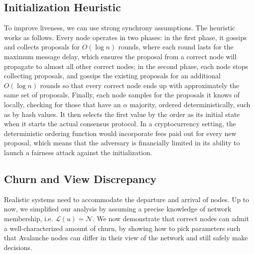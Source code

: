 \documentclass[letterpaper,twocolumn,10pt]{article}
\newcommand{\Oh}[1]{O(#1)}
\theoremstyle{definition}
\begin{document}
\begin{appendices}
\subsection{Initialization Heuristic}
\label{sec:sync-heuristic}
To improve liveness, we can use strong synchrony assumptions. The heuristic works as follows. Every node operates in two phases: in the first phase, it gossips and collects proposals for $\Oh{\log{n}}$ rounds, where each round lasts for the maximum message delay, which ensures the proposal from a correct node will propagate to almost all other correct nodes; in the second phase, each node stops collecting proposals, and gossips the existing proposals for an additional $\Oh{\log{n}}$ rounds so that every correct node ends up with approximately the same set of proposals. Finally, each node samples for the proposals it knows of locally, checking for those that have an $\alpha$ majority, ordered deterministically, such as by hash values. It then selects the first value by the order as its initial state when it starts the actual consensus protocol.
In a cryptocurrency setting, the deterministic ordering function would incorporate fees paid out for every new proposal, which means that the adversary is financially limited in its ability to launch a fairness attack against the initialization.

\subsection{Churn and View Discrepancy}\label{sec:full-analysis-churn}

Realistic systems need to accommodate the departure and arrival of nodes.
Up to now, we simplified our analysis by assuming a precise knowledge of network membership, i.e. $\mathcal{L}(u) = \mathcal{N}$.
We now demonstrate that correct nodes can admit a well-characterized amount of churn, by showing how to pick parameters such that Avalanche nodes can differ in their view of the network and still safely make decisions.

{\color{black} 

}
\end{appendices}
\end{document}
